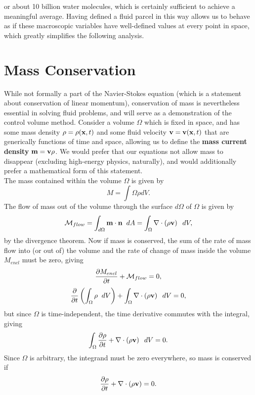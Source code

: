 or about 10 billion water molecules, which is certainly sufficient to achieve a meaningful average. Having defined a fluid parcel in this way allows us to behave as if these macroscopic variables have well-defined values at every point in space, which greatly simplifies the following analysis. 

\section{Mass Conservation}
While not formally a part of the Navier-Stokes equation (which is a statement about conservation of linear momentum), conservation of mass is nevertheless essential in solving fluid problems, and will serve as a demonstration of the control volume method. Consider a volume $\Omega$ which is fixed in space, and has some mass density $\rho = \rho(\mathbf{x},t)$ and some fluid velocity $\mathbf{v} = \mathbf{v}(\mathbf{x} ,t)$ that are generically functions of time and space, allowing us to define the {\bf mass current density} $\mathbf{m} = \mathbf{v}\rho$. We would prefer that our equations not allow mass to disappear (excluding high-energy physics, naturally), and would additionally prefer a mathematical form of this statement. \\

The mass contained within the volume $\Omega$ is given by 
\begin{equation}
M = \int{\Omega}{}{\rho}{dV}.
\end{equation}
The flow of mass out of the volume through the surface $d\Omega$ of $\Omega$ is given by 
\begin{equation}
\mathcal{M}_{flow} = \int{d\Omega}{}{\Vector{m}\cdot\Vector{n}}{dA} = \int{\Omega}{}{\Div{\paren{\rho\Vector{v}}}}{dV},
\end{equation}
by the divergence theorem.  Now if mass is conserved, the sum of the rate of mass flow into (or out of) the volume and the rate of change of mass inside the volume $M_{encl}$ must be zero, giving
\begin{equation}
\pder{1}{M_{encl}}{t} + \mathcal{M}_{flow} = 0,
\end{equation}
\begin{equation}
\pder{1}{}{t}\paren{\int{\Omega}{}{\rho}{dV}} + \int{\Omega}{}{\Div{\paren{\rho\Vector{v}}}}{dV} =0,
\end{equation}
but since $\Omega$ is time-independent, the time derivative commutes with the integral, giving 
\begin{equation}
\int{\Omega}{}{\pder{1}{\rho}{t} + \Div{\paren{\rho\Vector{v}}}}{dV} = 0.
\end{equation}
Since $\Omega$ is arbitrary, the integrand must be zero everywhere, so mass is conserved if
\begin{equation}\label{eq:consMassFull}
\pder{1}{\rho}{t} + \Div{\paren{\rho\Vector{v}} }= 0.
\end{equation}

